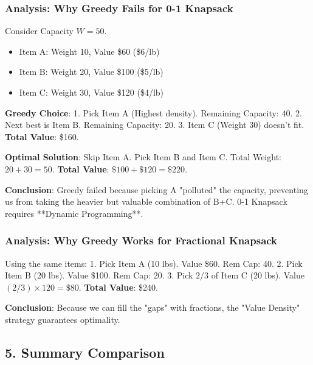 \documentclass[12pt]{article}
\theoremstyle{blueplain}
\theoremstyle{bluedef}
\theoremstyle{blueremark}
\begin{document}
\subsubsection{Analysis: Why Greedy Fails for 0-1 Knapsack}
Consider Capacity $W=50$.
\begin{itemize}
    \item Item A: Weight 10, Value \$60 (\$6/lb)
    \item Item B: Weight 20, Value \$100 (\$5/lb)
    \item Item C: Weight 30, Value \$120 (\$4/lb)
\end{itemize}
\textbf{Greedy Choice}:
1. Pick Item A (Highest density). Remaining Capacity: 40.
2. Next best is Item B. Remaining Capacity: 20.
3. Item C (Weight 30) doesn't fit.
\textbf{Total Value}: \$160.

\textbf{Optimal Solution}:
Skip Item A. Pick Item B and Item C.
Total Weight: $20+30=50$. \textbf{Total Value}: $\$100 + \$120 = \$220$.

\textbf{Conclusion}: Greedy failed because picking A "polluted" the capacity, preventing us from taking the heavier but valuable combination of B+C. 0-1 Knapsack requires **Dynamic Programming**.



\subsubsection{Analysis: Why Greedy Works for Fractional Knapsack}
Using the same items:
1. Pick Item A (10 lbs). Value \$60. Rem Cap: 40.
2. Pick Item B (20 lbs). Value \$100. Rem Cap: 20.
3. Pick $2/3$ of Item C (20 lbs). Value $(2/3) \times 120 = \$80$.
\textbf{Total Value}: \$240.

\textbf{Conclusion}: Because we can fill the "gaps" with fractions, the "Value Density" strategy guarantees optimality.

\subsection{5. Summary Comparison}
\end{document}
